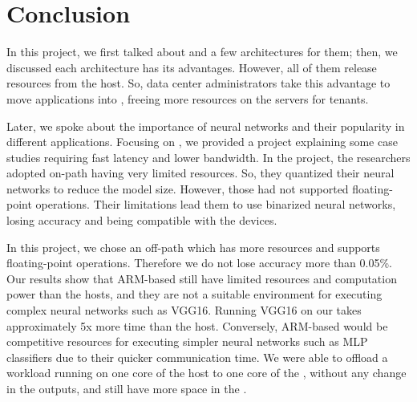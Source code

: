\section{Conclusion}
\label{sec-conlcu}

In this project, we first talked about \smartnics and a few architectures for them; then, we discussed each architecture has its advantages. However, all of them release resources from the host. So, data center administrators take this advantage to move applications into \smartnic, freeing more resources on the servers for tenants. 
\par
Later, we spoke about the importance of neural networks and their popularity in different applications. Focusing on \smartnic, we provided a project explaining some case studies requiring fast latency and lower bandwidth. In the project, the researchers adopted on-path \smartnics having very limited resources. So, they quantized their neural networks to reduce the model size. However, those \smartnics had not supported floating-point operations. Their limitations lead them to use binarized neural networks,  losing accuracy and being compatible with the devices.
\par
In this project, we chose an off-path \smartnic which has more resources and supports floating-point operations. Therefore we do not lose accuracy more than 0.05\%. Our results show that ARM-based \smartnics still have limited resources and computation power than the hosts, and they are not a suitable environment for executing complex neural networks such as VGG16. Running VGG16 on our \smartnic takes approximately 5x more time than the host. Conversely, ARM-based \smartnics would be competitive resources for executing simpler neural networks such as MLP classifiers due to their quicker communication time. We were able to offload a workload running on one core of the host to one core of the \smartnic, without any change in the outputs, and still have more space in the \smartnic.